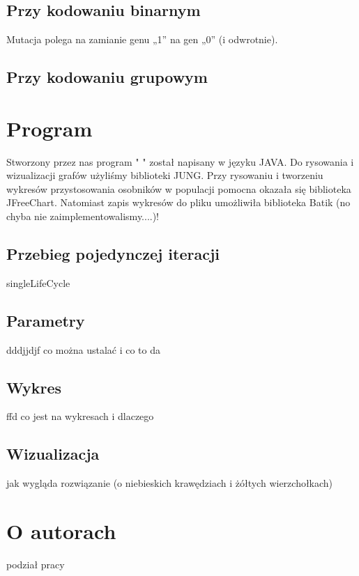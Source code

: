\documentclass[11pt]{aghdpl}
\begin{document}
\section{Przy kodowaniu binarnym}
\label{sec:kodBin}
Mutacja polega na zamianie genu „1” na gen „0” (i odwrotnie).
\section{Przy kodowaniu grupowym}
\label{sec:kodGru}

\chapter{Program}
\label{cha:program}
Stworzony przez nas program " " został napisany w języku JAVA. Do rysowania i wizualizacji grafów użyliśmy biblioteki JUNG. Przy rysowaniu i tworzeniu wykresów przystosowania osobników w populacji pomocna okazała się biblioteka JFreeChart. Natomiast zapis wykresów do pliku umożliwiła biblioteka Batik (no chyba nie zaimplementowalismy....)!
\section{Przebieg pojedynczej iteracji}
\label{sec:singleLifeCycle}
singleLifeCycle
\section{Parametry}
\label{sec:params}
dddjjdjf
co można ustalać i co to da
\section{Wykres}
\label{sec:chart}
ffd
co jest na wykresach i dlaczego
\section{Wizualizacja}
\label{sec:visualization}
jak wygląda rozwiązanie (o niebieskich krawędziach i żółtych wierzchołkach)

\chapter{O autorach} 
\label{cha:aboutAut}
podział pracy


%
%



% 
% 

%
%
%
%
%
%
\end{document}

